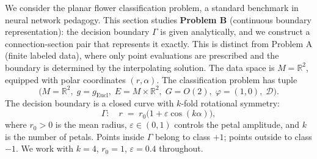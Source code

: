 \documentclass[11pt, a4paper]{article}
\theoremstyle{plain}
\theoremstyle{definition}
\newcommand{\R}{\mathbb{R}}
\newcommand{\Gam}{\Gamma}
\begin{document}
We consider the planar flower classification problem, a standard benchmark in
neural network pedagogy. This section studies \textbf{Problem B} (continuous boundary
representation): the decision boundary $\Gam$ is given analytically, and we
construct a connection-section pair that represents it exactly. This is distinct
from Problem A (finite labeled data), where only point evaluations are prescribed
and the boundary is determined by the interpolating solution. The data space is
$M = \R^2$, equipped with polar coordinates $(r, \alpha)$. The classification
problem has tuple
\[
  \bigl(M = \R^2,\; g = g_{\mathrm{Eucl}},\; E = M\times\R^2,\;
        G = O(2),\; \varphi = (1,0),\; \mathcal{D}\bigr).
\]
The decision boundary is a closed curve
with $k$-fold rotational symmetry:
\begin{equation}\label{eq:flower-boundary}
  \Gam:\quad r \;=\; r_0\bigl(1 + \varepsilon\cos(k\alpha)\bigr),
\end{equation}
where $r_0 > 0$ is the mean radius, $\varepsilon \in (0,1)$ controls the petal
amplitude, and $k$ is the number of petals. Points inside $\Gam$ belong to class
$+1$; points outside to class $-1$. We work with $k=4$, $r_0=1$, $\varepsilon=0.4$
throughout.
\end{document}
